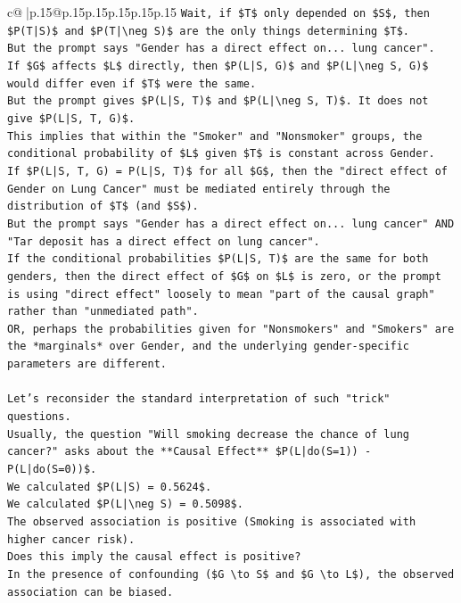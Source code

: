 \documentclass{article}
\begin{document}
{\begin{supertabular}{c@{$\;$}|p{.15\linewidth}@{}p{.15\linewidth}p{.15\linewidth}p{.15\linewidth}p{.15\linewidth}p{.15\linewidth}}
{{{\texttt{Wait, if \$T\$ only depended on \$S\$, then \$P(T|S)\$ and \$P(T|\textbackslash{}neg S)\$ are the only things determining \$T\$.} \\
\texttt{But the prompt says "Gender has a direct effect on... lung cancer".} \\
\texttt{If \$G\$ affects \$L\$ directly, then \$P(L|S, G)\$ and \$P(L|\textbackslash{}neg S, G)\$ would differ even if \$T\$ were the same.} \\
\texttt{But the prompt gives \$P(L|S, T)\$ and \$P(L|\textbackslash{}neg S, T)\$. It does not give \$P(L|S, T, G)\$.} \\
\texttt{This implies that within the "Smoker" and "Nonsmoker" groups, the conditional probability of \$L\$ given \$T\$ is constant across Gender.} \\
\texttt{If \$P(L|S, T, G) = P(L|S, T)\$ for all \$G\$, then the "direct effect of Gender on Lung Cancer" must be mediated entirely through the distribution of \$T\$ (and \$S\$).} \\
\texttt{But the prompt says "Gender has a direct effect on... lung cancer" AND "Tar deposit has a direct effect on lung cancer".} \\
\texttt{If the conditional probabilities \$P(L|S, T)\$ are the same for both genders, then the direct effect of \$G\$ on \$L\$ is zero, or the prompt is using "direct effect" loosely to mean "part of the causal graph" rather than "unmediated path".} \\
\texttt{OR, perhaps the probabilities given for "Nonsmokers" and "Smokers" are the *marginals* over Gender, and the underlying gender{-}specific parameters are different.} \\
\\ 
\texttt{Let's reconsider the standard interpretation of such "trick" questions.} \\
\texttt{Usually, the question "Will smoking decrease the chance of lung cancer?" asks about the **Causal Effect** \$P(L|do(S=1)) {-} P(L|do(S=0))\$.} \\
\texttt{We calculated \$P(L|S) = 0.5624\$.} \\
\texttt{We calculated \$P(L|\textbackslash{}neg S) = 0.5098\$.} \\
\texttt{The observed association is positive (Smoking is associated with higher cancer risk).} \\
\texttt{Does this imply the causal effect is positive?} \\
\texttt{In the presence of confounding (\$G \textbackslash{}to S\$ and \$G \textbackslash{}to L\$), the observed association can be biased.} \\
}}}
\end{supertabular}}
\end{document}
